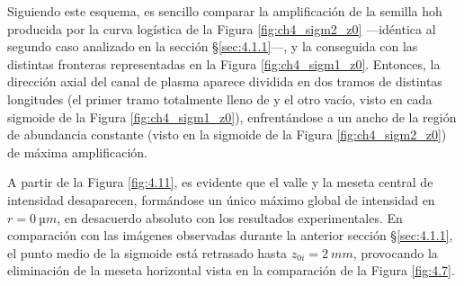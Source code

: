 Siguiendo este esquema, es sencillo comparar la amplificación de la semilla \acrshort{hoh} producida por la curva logística de la Figura \ref{fig:ch4_sigm2_z0} ---idéntica al segundo caso analizado en la sección \S\ref{sec:4.1.1}---, y la conseguida con las distintas fronteras representadas en la Figura \ref{fig:ch4_sigm1_z0}. Entonces, la dirección axial del canal de plasma aparece dividida en dos tramos de distintas longitudes (el primer tramo totalmente lleno de  y el otro vacío, visto en cada sigmoide de la Figura \ref{fig:ch4_sigm1_z0}), enfrentándose a un ancho de la región de abundancia constante (visto en la sigmoide de la Figura \ref{fig:ch4_sigm2_z0}) de máxima amplificación.

A partir de la Figura \ref{fig:4.11}, es evidente que el valle y la meseta central de intensidad desaparecen, formándose un único máximo global de intensidad en $r=\qty{0}{µm}$, en desacuerdo absoluto con los resultados experimentales. En comparación con las imágenes observadas durante la anterior sección \S\ref{sec:4.1.1}, el punto medio de la sigmoide está retrasado hasta $z_{0i}=\qty{2}{mm}$, provocando la eliminación de la meseta horizontal vista en la comparación de la Figura \ref{fig:4.7}.


